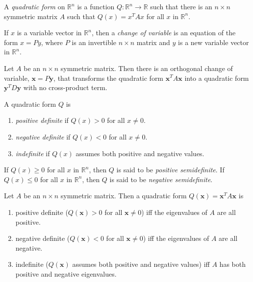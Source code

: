 \documentclass{article}
\begin{document}
\begin{defn}
    A \emph{quadratic form} on \(\mathbb{R}^n\) is a function \(Q:\mathbb{R}^n\to\mathbb{R}\) such that there is an \(n\times n\) symmetric matrix \(A\) such that \(Q(x) = x^TAx\) for all \(x\) in \(\mathbb{R}^n\).
\end{defn}

\begin{defn}
    If \(x\) is a variable vector in \(\mathbb{R}^n\), then a \emph{change of variable} is an equation of the form \(x = Py\), where \(P\) is an invertible \(n\times n\) matrix and \(y\) is a new variable vector in \(\mathbb{R}^n\).
\end{defn}

\begin{thm} 
    Let \(A\) be an \(n\times n\) symmetric matrix. Then there is an orthogonal change of variable, \(\textbf{x}=P\textbf{y}\), that transforms the quadratic form \(\textbf{x}^TA\textbf{x}\) into a quadratic form \(\textbf{y}^TD\textbf{y}\) with no cross-product term.
\end{thm}

\begin{defn}
    A quadratic form \(Q\) is
    \begin{enumerate}
        \item[a.] \emph{positive definite} if \(Q(x) > 0\) for all \(x \neq 0\).
        \item[b.] \emph{negative definite} if \(Q(x) < 0\) for all \(x \neq 0\).
        \item[c.] \emph{indefinite} if \(Q(x)\) assumes both positive and negative values.
    \end{enumerate}
\end{defn}

\begin{rem}
    If \(Q(x) \geq 0\) for all \(x\) in \(\mathbb{R}^n\), then \(Q\) is said to be \emph{positive semidefinite}. If \(Q(x) \leq 0\) for all \(x\) in \(\mathbb{R}^n\), then \(Q\) is said to be \emph{negative semidefinite}.
\end{rem}

\begin{thm} 
    Let \(A\) be an \(n\times n\) symmetric matrix. Then a quadratic form \(Q(\textbf{x})=\textbf{x}^TA\textbf{x}\) is
    \begin{enumerate}
        \item[a.] positive definite (\(Q(\textbf{x})>0\) for all \(\textbf{x}\neq0\)) iff the eigenvalues of \(A\) are all positive.
        \item[b.] negative definite (\(Q(\textbf{x})<0\) for all \(\textbf{x}\neq0\)) iff the eigenvalues of \(A\) are all negative.
        \item[c.] indefinite (\(Q(\textbf{x})\) assumes both positive and negative values) iff \(A\) has both positive and negative eigenvalues.
    \end{enumerate}
\end{thm}
\end{document}

